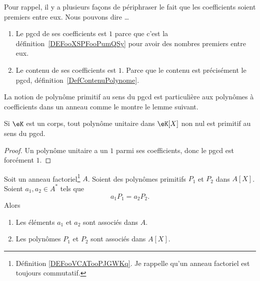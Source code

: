 \begin{normaltext}
	Pour rappel, il y a plusieurs façons de périphraser le fait que les coefficients soient premiers entre eux. Nous pouvons dire \ldots
	\begin{enumerate}
		\item
		      Le pgcd de ses coefficients est \( 1\) parce que c'est la définition~\ref{DEFooXSPFooPumQSy} pour avoir des nombres premiers entre eux.
		\item
		      Le contenu de ses coefficients est \( 1\). Parce que le contenu est précisément le pgcd, définition~\ref{DefContenuPolynome}.
	\end{enumerate}
\end{normaltext}

La notion de polynôme primitif au sens du pgcd est particulière aux polynômes à coefficients dans un anneau comme le montre le lemme suivant.



\begin{lemma}
	Si \( \eK\) est un corps, tout polynôme unitaire dans \( \eK[X]\) non nul est primitif au sens du pgcd.
\end{lemma}

\begin{proof}
	Un polynôme unitaire a un \( 1\) parmi ses coefficients, donc le pgcd est forcément \( 1\).
\end{proof}



\begin{lemma}
	Soit un anneau factoriel\footnote{Définition \ref{DEFooVCATooPJGWKq}. Je rappelle qu'un anneau factoriel est toujours commutatif.} \( A\). Soient des polynômes primitifs \( P_1\) et \( P_2\) dans \( A[X]\). Soient \( a_1,a_2\in A^*\) tels que
	\begin{equation}
		a_1P_1=a_2P_2.
	\end{equation}
	Alors
	\begin{enumerate}
		\item
		      Les éléments \( a_1\) et \( a_2\) sont associés dans \( A\).
		\item
		      Les polynômes \( P_1\) et \( P_2\) sont associés dans \( A[X]\).
	\end{enumerate}
\end{lemma}

